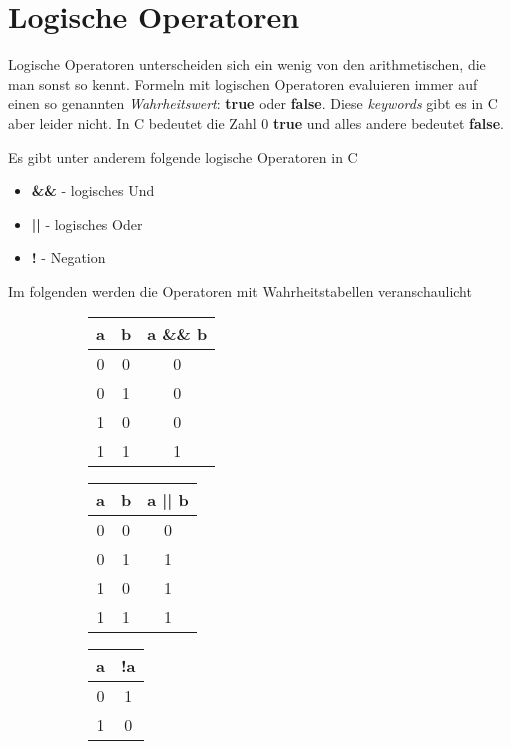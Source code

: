 \documentclass[c_worksheet.tex]{subfiles}
\begin{document}
\section{Logische Operatoren} 


Logische Operatoren unterscheiden sich ein wenig von den arithmetischen, die man sonst so kennt. Formeln mit logischen Operatoren evaluieren immer auf einen so genannten \emph{Wahrheitswert}: \textbf{true} oder \textbf{false}. Diese \emph{keywords} gibt es in C aber leider nicht. In C bedeutet die Zahl \(0\) \textbf{true} und alles andere bedeutet \textbf{false}.

Es gibt unter anderem folgende logische Operatoren in C

\begin{itemize}
	\item \textbf{\&\&} - logisches Und
	\item \textbf{||} - logisches Oder
	\item \textbf{!}  - Negation
\end{itemize}

Im folgenden werden die Operatoren mit Wahrheitstabellen veranschaulicht

\begin{figure}[H]
\begin{center}
\begin{subfigure}[b]{0.3\textwidth}
\centering
\begin{tabular}{ c | c | c }
a & b & a \&\& b \\
\hline
\hline
0 & 0 & 0 \\
\hline
0 & 1 & 0 \\
\hline
1 & 0 & 0 \\
\hline
1 & 1 & 1 \\
\end{tabular}
\end{subfigure}
\begin{subfigure}[b]{0.3\textwidth}
\centering
\begin{tabular}{ c | c | c }
a & b & a || b \\
\hline
\hline
0 & 0 & 0 \\
\hline
0 & 1 & 1 \\
\hline
1 & 0 & 1 \\
\hline
1 & 1 & 1 \\
\end{tabular}
\end{subfigure}
\begin{subfigure}[b]{0.3\textwidth}
\centering
\begin{tabular}{ c | c }
a & !a \\
\hline
\hline
0 & 1 \\
\hline
1 & 0 \\
\end{tabular}
\end{subfigure}
\end{center}
\end{figure}
\end{document}
